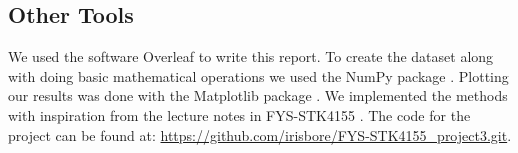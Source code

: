 \subsection{Other Tools}

We used the software Overleaf to write this report. To create the dataset along with doing basic mathematical operations we used the NumPy package \cite{harris2020numpy}. Plotting our results was done with the Matplotlib package \cite{hunter-2007matplotlib}. We implemented the methods with inspiration from the lecture notes in FYS-STK4155 \cite{Hjorth-Jensen_MachineLearning_2023}. The code for the project can be found at: \url{https://github.com/irisbore/FYS-STK4155_project3.git}.
